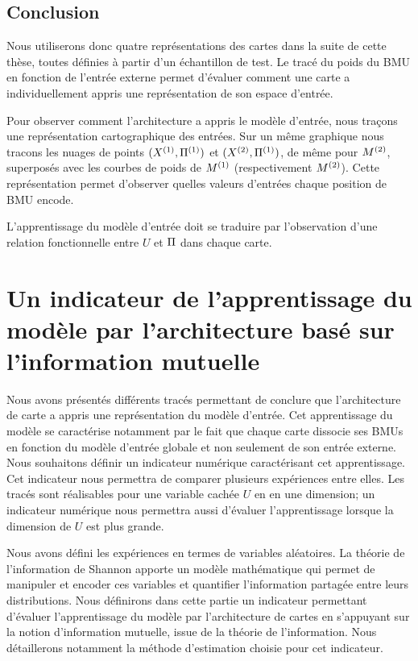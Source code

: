 \subsection{Conclusion}

Nous utiliserons donc quatre représentations des cartes dans la suite de cette thèse, toutes définies à partir d'un échantillon de test.
Le tracé du poids du BMU en fonction de l'entrée externe permet d'évaluer comment une carte a individuellement appris une représentation de son espace d'entrée. 

Pour observer comment l'architecture a appris le modèle d'entrée, nous traçons une représentation cartographique des entrées. Sur un même graphique nous tracons les nuages de points $(X^{({1})},\Pi^{({1})})$ et $(X^{({2})},\Pi^{({1})})$, de même pour $M^{({2})}$, superposés avec les courbes de poids de $M^{({1})}$ (respectivement $M^{({2})}$). Cette représentation permet d'observer quelles valeurs d'entrées chaque position de BMU encode.


L'apprentissage du modèle d'entrée doit se traduire par l'observation d'une relation fonctionnelle entre $U$ et $\Pi$ dans chaque carte.



\section{Un indicateur de l'apprentissage du modèle par l'architecture basé sur l'information mutuelle}

Nous avons présentés différents tracés permettant de conclure que l'architecture de carte a appris une représentation du modèle d'entrée. Cet apprentissage du modèle se caractérise notamment par le fait que chaque carte dissocie ses BMUs en fonction du modèle d'entrée globale et non seulement de son entrée externe. 
Nous souhaitons définir un indicateur numérique caractérisant cet apprentissage. Cet indicateur nous permettra de comparer plusieurs expériences entre elles. Les tracés sont réalisables pour une variable cachée $U$ en en une dimension; un indicateur numérique nous permettra aussi d'évaluer l'apprentissage lorsque la dimension de $U$ est plus grande.

Nous avons défini les expériences en termes de variables aléatoires. La théorie de l'information de Shannon \cite{Shannon1948AMT} apporte un modèle mathématique qui permet de manipuler et encoder ces variables et quantifier l'information partagée entre leurs distributions.
Nous définirons dans cette partie un indicateur permettant d'évaluer l'apprentissage du modèle par l'architecture de cartes en s'appuyant sur la notion d'information mutuelle, issue de la théorie de l'information. Nous détaillerons notamment la méthode d'estimation choisie pour cet indicateur.

